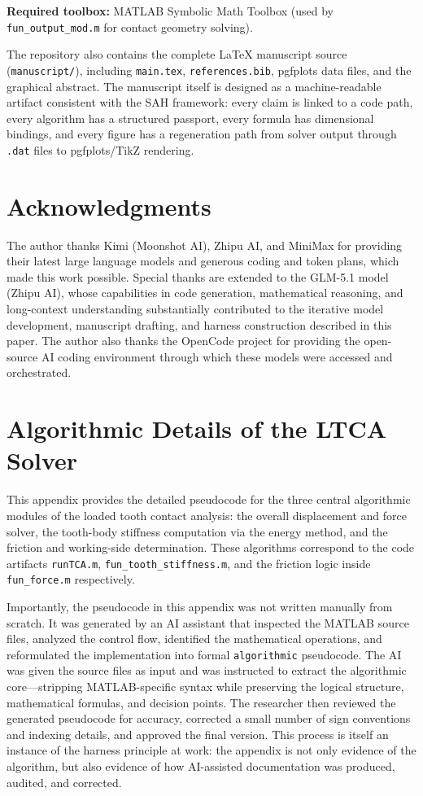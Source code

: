 \documentclass{article}
\begin{document}
\noindent\textbf{Required toolbox:} MATLAB Symbolic Math Toolbox (used by \texttt{fun\_output\_mod.m} for contact geometry solving).

The repository also contains the complete \LaTeX{} manuscript source (\texttt{manuscript/}), including \texttt{main.tex}, \texttt{references.bib}, pgfplots data files, and the graphical abstract. The manuscript itself is designed as a machine-readable artifact consistent with the SAH framework: every claim is linked to a code path, every algorithm has a structured passport, every formula has dimensional bindings, and every figure has a regeneration path from solver output through \texttt{.dat} files to pgfplots/TikZ rendering.

\section*{Acknowledgments}

The author thanks Kimi (Moonshot AI), Zhipu AI, and MiniMax for providing their latest large language models and generous coding and token plans, which made this work possible. Special thanks are extended to the GLM-5.1 model (Zhipu AI), whose capabilities in code generation, mathematical reasoning, and long-context understanding substantially contributed to the iterative model development, manuscript drafting, and harness construction described in this paper. The author also thanks the OpenCode project for providing the open-source AI coding environment through which these models were accessed and orchestrated.

\appendix

\section{Algorithmic Details of the LTCA Solver}
\label{sec:appendix_algorithms}

This appendix provides the detailed pseudocode for the three central algorithmic modules of the loaded tooth contact analysis: the overall displacement and force solver, the tooth-body stiffness computation via the energy method, and the friction and working-side determination. These algorithms correspond to the code artifacts \texttt{runTCA.m}, \texttt{fun\_tooth\_stiffness.m}, and the friction logic inside \texttt{fun\_force.m} respectively.

Importantly, the pseudocode in this appendix was not written manually from scratch. It was generated by an AI assistant that inspected the MATLAB source files, analyzed the control flow, identified the mathematical operations, and reformulated the implementation into formal \texttt{algorithmic} pseudocode. The AI was given the source files as input and was instructed to extract the algorithmic core---stripping MATLAB-specific syntax while preserving the logical structure, mathematical formulas, and decision points. The researcher then reviewed the generated pseudocode for accuracy, corrected a small number of sign conventions and indexing details, and approved the final version. This process is itself an instance of the harness principle at work: the appendix is not only evidence of the algorithm, but also evidence of how AI-assisted documentation was produced, audited, and corrected.
\end{document}

